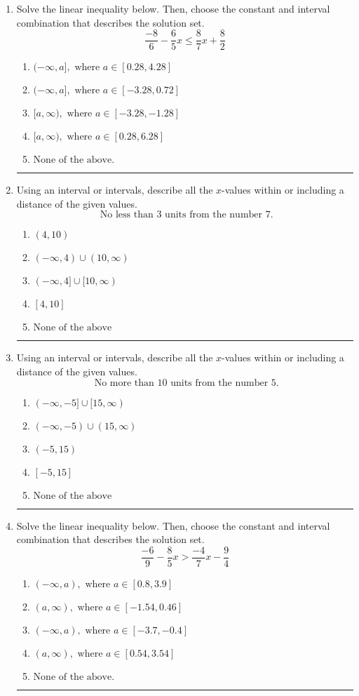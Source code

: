 \documentclass[14pt]{extbook}
\newcommand{\litem}[1]{\item#1\hspace*{-1cm}\rule{\textwidth}{0.4pt}}
\begin{document}
\begin{enumerate}
\litem{
Solve the linear inequality below. Then, choose the constant and interval combination that describes the solution set.\[ \frac{-8}{6} - \frac{6}{5} x \leq \frac{8}{7} x + \frac{8}{2} \]\begin{enumerate}[label=\Alph*.]
\item \( (-\infty, a], \text{ where } a \in [0.28, 4.28] \)
\item \( (-\infty, a], \text{ where } a \in [-3.28, 0.72] \)
\item \( [a, \infty), \text{ where } a \in [-3.28, -1.28] \)
\item \( [a, \infty), \text{ where } a \in [0.28, 6.28] \)
\item \( \text{None of the above}. \)

\end{enumerate} }
\litem{
Using an interval or intervals, describe all the $x$-values within or including a distance of the given values.\[ \text{ No less than } 3 \text{ units from the number } 7. \]\begin{enumerate}[label=\Alph*.]
\item \( (4, 10) \)
\item \( (-\infty, 4) \cup (10, \infty) \)
\item \( (-\infty, 4] \cup [10, \infty) \)
\item \( [4, 10] \)
\item \( \text{None of the above} \)

\end{enumerate} }
\litem{
Using an interval or intervals, describe all the $x$-values within or including a distance of the given values.\[ \text{ No more than } 10 \text{ units from the number } 5. \]\begin{enumerate}[label=\Alph*.]
\item \( (-\infty, -5] \cup [15, \infty) \)
\item \( (-\infty, -5) \cup (15, \infty) \)
\item \( (-5, 15) \)
\item \( [-5, 15] \)
\item \( \text{None of the above} \)

\end{enumerate} }
\litem{
Solve the linear inequality below. Then, choose the constant and interval combination that describes the solution set.\[ \frac{-6}{9} - \frac{8}{5} x > \frac{-4}{7} x - \frac{9}{4} \]\begin{enumerate}[label=\Alph*.]
\item \( (-\infty, a), \text{ where } a \in [0.8, 3.9] \)
\item \( (a, \infty), \text{ where } a \in [-1.54, 0.46] \)
\item \( (-\infty, a), \text{ where } a \in [-3.7, -0.4] \)
\item \( (a, \infty), \text{ where } a \in [0.54, 3.54] \)
\item \( \text{None of the above}. \)


\end{enumerate}}
\end{enumerate}
\end{document}

